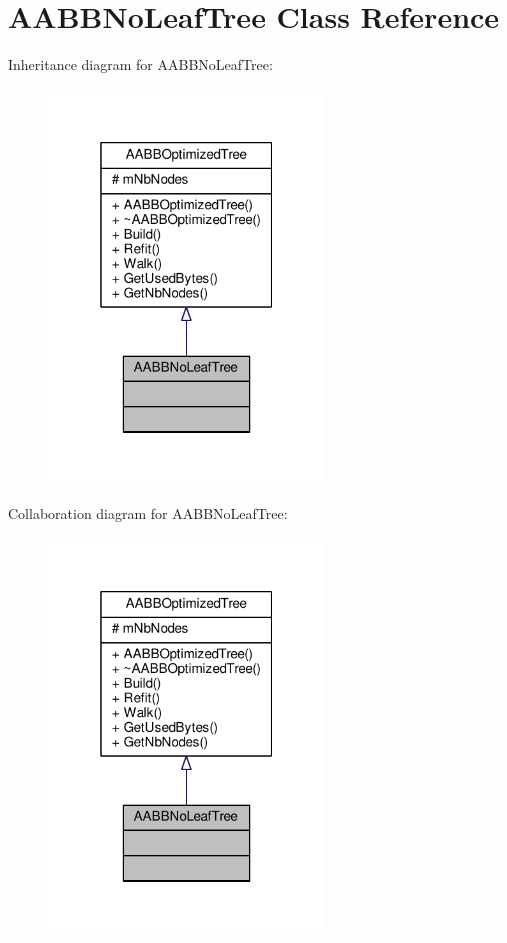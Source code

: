 \hypertarget{classAABBNoLeafTree}{}\section{A\+A\+B\+B\+No\+Leaf\+Tree Class Reference}
\label{classAABBNoLeafTree}


Inheritance diagram for A\+A\+B\+B\+No\+Leaf\+Tree\+:
\nopagebreak
\begin{figure}[H]
\begin{center}
\leavevmode
\includegraphics[width=208pt]{da/df0/classAABBNoLeafTree__inherit__graph}
\end{center}
\end{figure}


Collaboration diagram for A\+A\+B\+B\+No\+Leaf\+Tree\+:
\nopagebreak
\begin{figure}[H]
\begin{center}
\leavevmode
\includegraphics[width=208pt]{d5/d49/classAABBNoLeafTree__coll__graph}
\end{center}
\end{figure}
